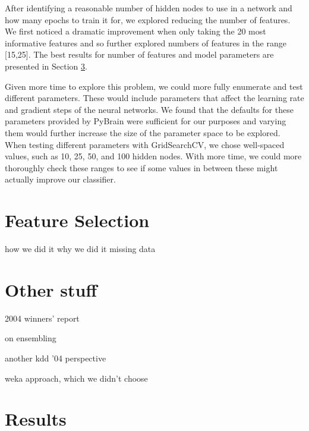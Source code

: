 \documentclass{article}
\begin{document}
After identifying a reasonable number of hidden nodes to use in a network and how many epochs to train it for, we explored reducing the number of features.
We first noticed a dramatic improvement when only taking the 20 most informative features and so further explored numbers of features in the range [15,25].
The best results for number of features and model parameters are presented in Section \ref{results}.

Given more time to explore this problem, we could more fully enumerate and test different parameters.
These would include parameters that affect the learning rate and gradient steps of the neural networks.
We found that the defaults for these parameters provided by PyBrain were sufficient for our purposes and varying them would further increase the size of the parameter space to be explored.
When testing different parameters with GridSearchCV, we chose well-spaced values, such as 10, 25, 50, and 100 hidden nodes.
With more time, we could more thoroughly check these ranges to see if some values in between these might actually improve our classifier.



\section{Feature Selection}
how we did it
why we did it
  missing data


\section{Other stuff}
2004 winners' report \cite{vogel2004anti}

on ensembling \cite{caruana2004ensemble}

another kdd '04 perspective \cite{caruana2004kdd}

weka approach, which we didn't choose \cite{pfahringer2004weka}


\section{Results}
\label{results}
\end{document}
